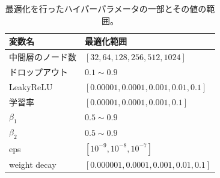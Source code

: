 \begin{table}[H]
\centering
 \begin{tabular}{ l  l }
 \hline
 変数名 & 最適化範囲\\
 \hline
 \hline
 中間層のノード数 & $[32, 64, 128, 256, 512, 1024]$\\
 ドロップアウト & $0.1 \sim 0.9$\\
 LeakyReLU & $[0.00001, 0.0001, 0.001, 0.01, 0.1]$\\
 学習率 & $[0.00001, 0.0001, 0.001, 0.1]$\\
 $\beta_1$ & $0.5 \sim 0.9$\\ 
 $\beta_2$ & $0.5 \sim 0.9$\\ 
 eps & $[10^{-9}, 10^{-8}, 10^{-7}]$\\
 weight decay & $[0.000001, 0.0001, 0.001, 0.01, 0.1]$\\
  \hline
 \end{tabular}
 \label{dnnoptuna}
 \caption{最適化を行ったハイパーパラメータの一部とその値の範囲。}
\end{table}

